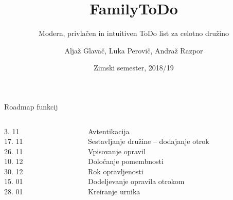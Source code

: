 \documentclass[10pt]{beamer}
\title{FamilyToDo}
\subtitle{Modern, privlačen in intuitiven ToDo list za celotno družino}
\date{Zimski semester, 2018/19}
\author{Aljaž Glavač, Luka Perovič, Andraž Razpor}
\institute{Univerza v Ljubljani, Fakulteta za računalništvo in informatiko}
\begin{document}
\maketitle


\begin{frame}{Roadmap funkcij}
\begin{columns}[c]
    \begin{column}{0.1\textwidth}
        \hfill 3. 11 \\
        \hfill 17. 11 \\
        \hfill 26. 11 \\
        \hfill 10. 12 \\
        \hfill 30. 12 \\
        \hfill 15. 01 \\
        \hfill 28. 01 \\
    \end{column}
    \hspace{-15pt}\vrule\hspace{5pt}%
    \begin{column}{0.9\textwidth}  %
            Avtentikacija \\
            Sestavljanje družine -- dodajanje otrok \\
            Vpisovanje opravil \\
            Določanje pomembnosti \\
            Rok opravljenosti \\
            Dodeljevanje opravila otrokom \\
            Kreiranje urnika \\
    \end{column}
\end{columns}
\end{frame}

\end{document}
